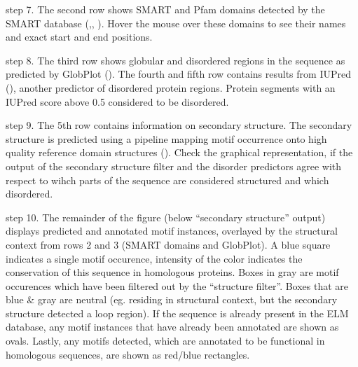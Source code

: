 step 7. The second row shows SMART and Pfam domains detected by the
SMART database (\cite{9600884},\cite{25300481}, \cite{9600884}). Hover
the mouse over these domains to see their names and exact start and end
positions.


step 8. The third row shows globular and disordered regions in the
sequence as predicted by GlobPlot (\cite{12824398}). The fourth and
fifth row contains results from IUPred (\cite{15955779}), another
predictor of disordered protein regions. Protein segments with an IUPred
score above 0.5 considered to be disordered.


step 9. The 5th row contains information on secondary structure. The
secondary structure is predicted using a pipeline mapping motif
occurrence onto high quality reference domain structures
(\cite{19852836}). Check the graphical representation, if the output of
the secondary structure filter and the disorder predictors agree with
respect to wihch parts of the sequence are considered structured and
which disordered.

step 10. The remainder of the figure (below ``secondary structure''
output) displays predicted and annotated motif instances, overlayed by
the structural context from rows 2 and 3 (SMART domains and GlobPlot). A
blue square indicates a single motif occurence, intensity of the color
indicates the conservation of this sequence in homologous proteins.
Boxes in gray are motif occurences which have been filtered out by the
``structure filter''. Boxes that are blue \& gray are neutral (eg.
residing in structural context, but the secondary structure detected a
loop region). If the sequence is already present in the ELM database,
any motif instances that have already been annotated are shown as ovals.
Lastly, any motifs detected, which are annotated to be functional in
homologous sequences, are shown as red/blue rectangles.

